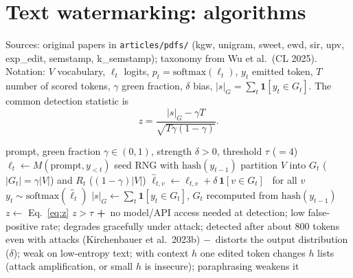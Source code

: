 \documentclass[10pt,a4paper,twocolumn]{article}
\newcommand{\pro}[1]{\Statex\textcolor{proc}{\textbf{+}\ #1}}
\newcommand{\con}[1]{\Statex\textcolor{conc}{\textbf{$-$}\ #1}}
\begin{document}
\section{Text watermarking: algorithms}
Sources: original papers in \texttt{articles/pdfs/} (kgw, unigram, sweet, ewd, sir, upv, exp\_edit, semstamp, k\_semstamp); taxonomy from Wu et al.\ (CL 2025). Notation: $V$ vocabulary, $\ell_t$ logits, $p_t=\mathrm{softmax}(\ell_t)$, $y_t$ emitted token, $T$ number of scored tokens, $\gamma$ green fraction, $\delta$ bias, $|s|_G=\sum_t\mathbf 1[y_t\in G_t]$. The common detection statistic is
\begin{equation}\label{eq:z}
z=\frac{|s|_G-\gamma T}{\sqrt{T\gamma(1-\gamma)}}.
\end{equation}

\begin{algorithm}[H]\small
\caption{KGW soft red list (Kirchenbauer et al.\ 2023)}
\begin{algorithmic}[1]
\Require prompt, green fraction $\gamma\in(0,1)$, strength $\delta>0$, threshold $\tau$ ($=4$)
  \State $\ell_t\gets M(\text{prompt},y_{<t})$
  \State seed RNG with $\mathrm{hash}(y_{t-1})$
  \State partition $V$ into $G_t$ ($|G_t|=\gamma|V|$) and $R_t$ ($(1-\gamma)|V|$)
  \State $\hat\ell_{t,v}\gets\ell_{t,v}+\delta\,\mathbf 1[v\in G_t]$ \ for all $v$
  \State $y_t\sim\mathrm{softmax}(\hat\ell_t)$
 \EndFor
\EndProcedure
{}
 \State $|s|_G\gets\sum_t\mathbf 1[y_t\in G_t]$, $G_t$ recomputed from $\mathrm{hash}(y_{t-1})$
 \State $z\gets$ Eq.~\eqref{eq:z}
 \State \Return $z>\tau$
\EndProcedure
\pro{no model/API access needed at detection; low false-positive rate; degrades gracefully under attack; detected after about 800 tokens even with attacks (Kirchenbauer et al.\ 2023b)}
\con{distorts the output distribution ($\delta$); weak on low-entropy text; with context $h$ one edited token changes $h$ lists (attack amplification, or small $h$ is insecure); paraphrasing weakens it}
\end{algorithmic}
\end{algorithm}
\end{document}
